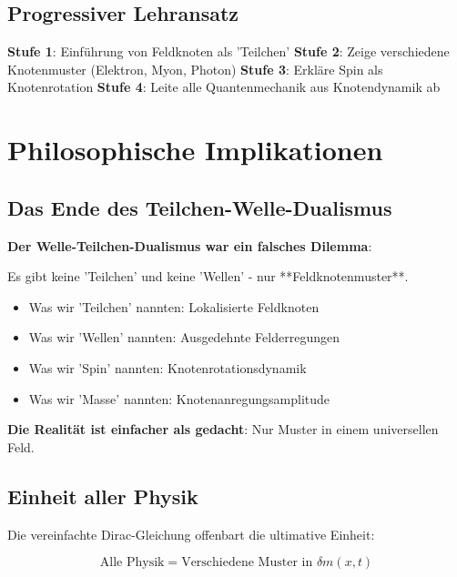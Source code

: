 \documentclass[12pt,a4paper]{article}
\newcommand{\deltam}{\delta m}
\theoremstyle{definition}
\theoremstyle{remark}
\begin{document}
	\subsection{Progressiver Lehransatz}
	
	\textbf{Stufe 1}: Einführung von Feldknoten als  'Teilchen'
	\textbf{Stufe 2}: Zeige verschiedene Knotenmuster (Elektron, Myon, Photon)
	\textbf{Stufe 3}: Erkläre Spin als Knotenrotation
	\textbf{Stufe 4}: Leite alle Quantenmechanik aus Knotendynamik ab
	
	\section{Philosophische Implikationen}
	
	\subsection{Das Ende des Teilchen-Welle-Dualismus}
	
	\begin{tcolorbox}[colback=purple!5!white,colframe=purple!75!black,title=Philosophische Revolution]
		\textbf{Der Welle-Teilchen-Dualismus war ein falsches Dilemma}:
		
		Es gibt keine 'Teilchen' und keine 'Wellen' - nur **Feldknotenmuster**.
		
		\begin{itemize}
			\item Was wir 'Teilchen' nannten: Lokalisierte Feldknoten
			\item Was wir 'Wellen' nannten: Ausgedehnte Felderregungen  
			\item Was wir 'Spin' nannten: Knotenrotationsdynamik
			\item Was wir 'Masse' nannten: Knotenanregungsamplitude
		\end{itemize}
		
		\textbf{Die Realität ist einfacher als gedacht}: Nur Muster in einem universellen Feld.
	\end{tcolorbox}
	
	\subsection{Einheit aller Physik}
	
	Die vereinfachte Dirac-Gleichung offenbart die ultimative Einheit:
	
	\begin{equation}
		\text{Alle Physik} = \text{Verschiedene Muster in } \deltam(x,t)
	\end{equation}
	
\end{document}

